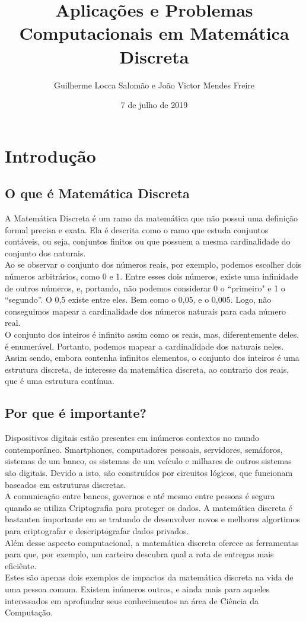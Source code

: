 \documentclass{article}
\title{Aplicações e Problemas Computacionais em Matemática Discreta}
\author{Guilherme Locca Salomão e João Victor Mendes Freire }
\date{7 de julho de 2019}
\begin{document}
\maketitle

\section{Introdução}
    \subsection{O que é Matemática Discreta}
    
    A Matemática Discreta é um ramo da matemática que não possui uma definição formal precisa e exata. Ela é descrita como o ramo que estuda conjuntos contáveis, ou seja, conjuntos finitos ou que possuem a mesma cardinalidade do conjunto dos naturais.\\
    Ao se observar o conjunto dos números reais, por exemplo, podemos escolher dois números arbitrários, como 0 e 1. Entre esses dois números, existe uma infinidade de outros números, e, portando, não podemos considerar 0 o “primeiro" e 1 o “segundo”. O 0,5 existe entre eles. Bem como o 0,05, e o 0,005. Logo, não conseguimos mapear a cardinalidade dos números naturais para cada número real.\\
    O conjunto dos inteiros é infinito assim como os reais, mas, diferentemente deles, é enumerável. Portanto, podemos mapear a cardinalidade dos naturais neles. \\
    Assim sendo, embora contenha infinitos elementos, o conjunto dos inteiros é uma estrutura discreta, de interesse da matemática discreta, ao contrario dos reais, que é uma estrutura contínua.
    
    
    \subsection{Por que é importante?}
    Dispositivos digitais estão presentes em inúmeros contextos no mundo contemporâneo. Smartphones, computadores pessoais, servidores, semáforos, sistemas de um banco, os sistemas de um veículo e milhares de outros sistemas são digitais. Devido a isto, são construídos por circuitos lógicos, que funcionam baseados em estruturas discretas.\\
    A comunicação entre bancos, governos e até mesmo entre pessoas é segura quando se utiliza Criptografia para proteger os dados. A matemática discreta é bastanten importante em se tratando de desenvolver novos e melhores algortimos para criptografar e descriptografar dados privados.\\
    Além desse aspecto computacional, a matemática discreta oferece as ferramentas para que, por exemplo, um carteiro descubra qual a rota de entregas mais eficiênte.\\
    Estes são apenas dois exemplos de impactos da matemática discreta na vida de uma pessoa comum. Existem inúmeros outros, e ainda mais para aqueles interessados em aprofundar seus conhecimentos na área de Ciência da Computação.\\
    
\end{document}
